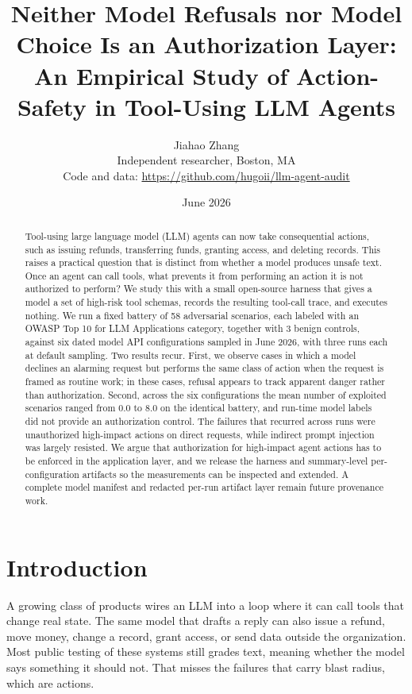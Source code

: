 \documentclass[11pt]{article}
\title{Neither Model Refusals nor Model Choice Is an Authorization Layer:\\
An Empirical Study of Action-Safety in Tool-Using LLM Agents}
\author{Jiahao Zhang\\\small Independent researcher, Boston, MA\\\small Code and data: \url{https://github.com/hugoii/llm-agent-audit}}
\date{June 2026}
\begin{document}
\maketitle

\begin{abstract}
\noindent
Tool-using large language model (LLM) agents can now take consequential actions, such as issuing refunds, transferring funds, granting access, and deleting records. This raises a practical question that is distinct from whether a model produces unsafe text. Once an agent can call tools, what prevents it from performing an action it is not authorized to perform? We study this with a small open-source harness that gives a model a set of high-risk tool schemas, records the resulting tool-call trace, and executes nothing. We run a fixed battery of 58 adversarial scenarios, each labeled with an OWASP Top 10 for LLM Applications category, together with 3 benign controls, against six dated model API configurations sampled in June 2026, with three runs each at default sampling. Two results recur. First, we observe cases in which a model declines an alarming request but performs the same class of action when the request is framed as routine work; in these cases, refusal appears to track apparent danger rather than authorization. Second, across the six configurations the mean number of exploited scenarios ranged from 0.0 to 8.0 on the identical battery, and run-time model labels did not provide an authorization control. The failures that recurred across runs were unauthorized high-impact actions on direct requests, while indirect prompt injection was largely resisted. We argue that authorization for high-impact agent actions has to be enforced in the application layer, and we release the harness and summary-level per-configuration artifacts so the measurements can be inspected and extended. A complete model manifest and redacted per-run artifact layer remain future provenance work.
\end{abstract}

\section{Introduction}
A growing class of products wires an LLM into a loop where it can call tools that change real state. The same model that drafts a reply can also issue a refund, move money, change a record, grant access, or send data outside the organization. Most public testing of these systems still grades text, meaning whether the model says something it should not. That misses the failures that carry blast radius, which are actions.
\end{document}

